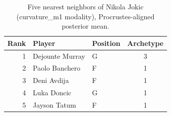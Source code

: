 \begin{table}[htbp]
  \centering\small
  \begin{tabular}{rllc}
    \toprule
    Rank & Player & Position & Archetype \\
    \midrule
    1 & Dejounte Murray & G & 3 \\
    2 & Paolo Banchero & F & 1 \\
    3 & Deni Avdija & F & 1 \\
    4 & Luka Doncic & G & 1 \\
    5 & Jayson Tatum & F & 1 \\
    \bottomrule
  \end{tabular}
  \caption{Five nearest neighbors of Nikola Jokic (curvature_m1 modality), Procrustes-aligned posterior mean.}
  \label{tab:Nikola_Jokic_neighbors_curvature_m1}
\end{table}

